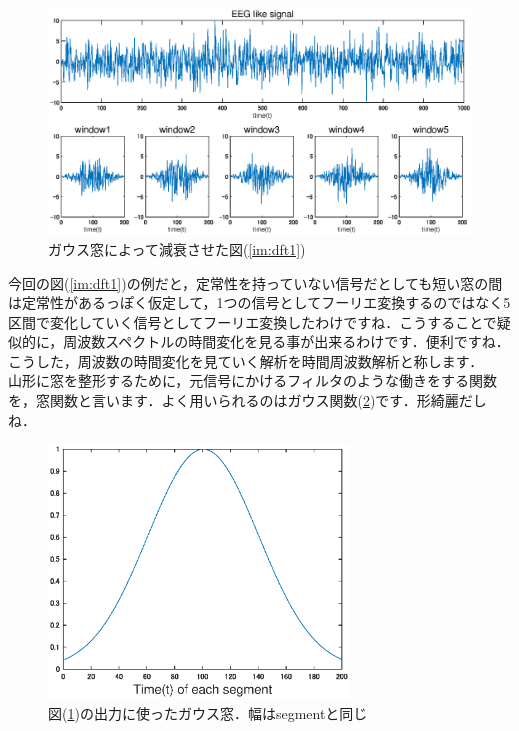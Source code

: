 \documentclass[11pt,a4paper]{ujreport} 	%
\begin{document}
\begin{figure}[H]
  \label{im:dft2}
  \centering
  \includegraphics[width=15cm]{../figures/dft2.eps}
  \caption{ガウス窓によって減衰させた図(\ref{im:dft1})}
\end{figure}

今回の図(\ref{im:dft1})の例だと，定常性を持っていない信号だとしても短い窓の間は定常性があるっぽく仮定して，1つの信号としてフーリエ変換するのではなく5区間で変化していく信号としてフーリエ変換したわけですね．こうすることで疑似的に，周波数スペクトルの時間変化を見る事が出来るわけです．便利ですね．こうした，周波数の時間変化を見ていく解析を時間周波数解析と称します．\\

山形に窓を整形するために，元信号にかけるフィルタのような働きをする関数を，窓関数と言います．よく用いられるのはガウス関数(\ref{im:gauss-window})です．形綺麗だしね．

\begin{figure}[H]
  \label{im:gauss-window}
  \centering
  \includegraphics[width=8cm]{../figures/gauss-window.eps}
  \caption{図(\ref{im:dft2})の出力に使ったガウス窓．幅はsegmentと同じ}
\end{figure}
\end{document}
